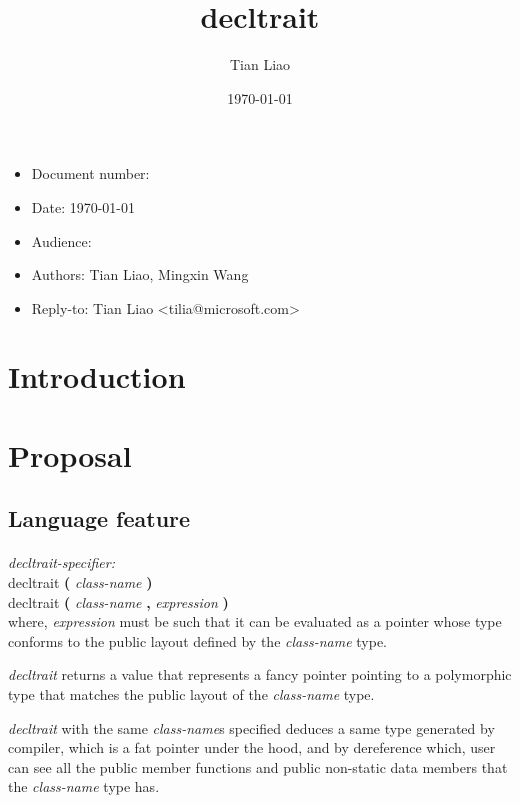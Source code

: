 \documentclass{article}
\title{decltrait}
\author{Tian Liao}
\date{\today}
\begin{document}
\maketitle
\vfill
\begin{itemize}[noitemsep]
  \item[] Document number:
  \item[] Date: \today
  \item[] Audience:
  \item[] Authors: Tian Liao, Mingxin Wang
  \item[] Reply-to: Tian Liao \textless tilia@microsoft.com\textgreater
\end{itemize}

\newpage
{}

\section{Introduction}

\section{Proposal}

\subsection{Language feature}
\paragraph{} \textit{decltrait-specifier:} \\
\indent decltrait \textbf{(} \textit{class-name} \textbf{)} \\
\indent decltrait \textbf{(} \textit{class-name} \textbf{,} \textit{expression} \textbf{)} \\
where, \textit{expression} must be such that it can be evaluated as a pointer whose type conforms to the public layout defined by the \textit{class-name} type.

\textit{decltrait} returns a value that represents a fancy pointer pointing to a polymorphic type that matches the public layout of the \textit{class-name} type.

\textit{decltrait} with the same \textit{class-name}s specified deduces a same type generated by compiler, which is a fat pointer under the hood, and by dereference which, user can see all the public member functions and public non-static data members that the \textit{class-name} type has.
\end{document}
